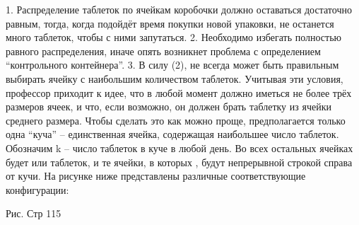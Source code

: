 1.  Распределение таблеток по ячейкам коробочки должно оставаться достаточно равным, тогда, когда подойдёт время покупки новой упаковки, не останется много таблеток, чтобы с ними запутаться.
2. Необходимо избегать полностью равного распределения, иначе опять возникнет проблема с определением “контрольного контейнера”.
3. В силу (2), не всегда может быть правильным выбирать ячейку с наибольшим количеством таблеток.
  Учитывая эти условия, профессор приходит к идее, что в любой момент должно иметься не более трёх размеров ячеек, и что, если возможно, он должен брать таблетку из ячейки среднего размера. Чтобы сделать это как можно проще, предполагается только одна “куча” -- единственная ячейка, содержащая наибольшее число таблеток.  Обозначим k -- число таблеток в куче в любой день. Во всех остальных ячейках будет   или    таблеток,  и те ячейки, в которых  , будут непрерывной строкой справа от кучи. На рисунке ниже представлены различные  соответствующие конфигурации:




                                 Рис. Стр 115


